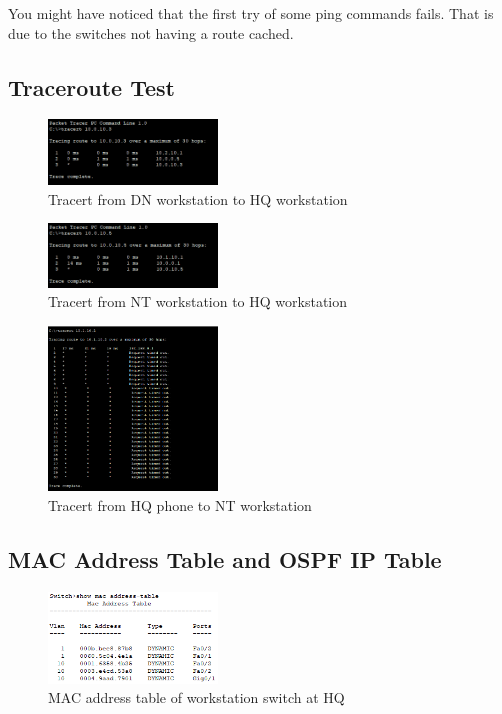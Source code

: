 You might have noticed that the first try of some ping commands fails.
That is due to the switches not having a route cached.

\subsection{Traceroute Test}
\begin{figure}[H]
  \centering
  \includegraphics[width=0.4\textwidth]{./assets/trace.dnw-hqw.png}
  \caption{Tracert from DN workstation to HQ workstation}
\end{figure}

\begin{figure}[H]
  \centering
  \includegraphics[width=0.4\textwidth]{./assets/trace.ntw-hqw.png}
  \caption{Tracert from NT workstation to HQ workstation}
\end{figure}

\begin{figure}[H]
  \centering
  \includegraphics[width=0.4\textwidth]{./assets/trace.hqp-ntw.png}
  \caption{Tracert from HQ phone to NT workstation}
\end{figure}

\subsection{MAC Address Table and OSPF IP Table}
\begin{figure}[H]
  \centering
  \includegraphics[width=0.4\textwidth]{./assets/mac.hqw.png}
  \caption{MAC address table of workstation switch at HQ}
\end{figure}

